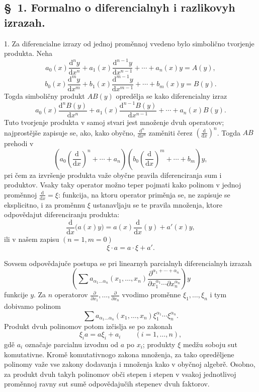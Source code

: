 \documentclass[11pt]{article}
\providecommand{\dd}{\mathrm d}
\providecommand{\p}{\partial}
\begin{document}
\subsection*{\S~1. Formalno o diferencialnyh i razlikovyh izrazah.}

1. Za diferencialne izrazy od jednoj proměnnoj vvedeno bylo simbolično tvorjenje produkta. Neha
\[
 a_0(x)\frac{\dd^n y}{\dd x^n}+a_1(x)\frac{\dd^{n-1}y}{\dd x^{n-1}}+\cdots+a_n(x)y=A(y),
\]
\[
 b_0(x)\frac{\dd^m y}{\dd x^m}+b_1(x)\frac{\dd^{m-1}y}{\dd x^{m-1}}+\cdots+b_m(x)y=B(y).
\]
Togda simboličny produkt \(AB(y)\) opredělja se kako diferencialny izraz
\[
 a_0(x)\frac{\dd^n B(y)}{\dd x^n}+a_1(x)\frac{\dd^{n-1}B(y)}{\dd x^{n-1}}+\cdots+a_n(x)B(y).
\]
Tuto tvorjenje produkta v samoj stvari jest množenje dvuh operatorov; najprostějše zapisuje se, ako, kako obyčno, \(\frac{\dd^n}{\dd x^n}\) zaměniti čerez \(\left(\frac{\dd}{\dd x}\right)^n\). Togda \(AB\) prehodi v
\[
 \left(a_0\left(\frac{\dd}{\dd x}\right)^n+\cdots+a_n\right)
 \left(b_0\left(\frac{\dd}{\dd x}\right)^m+\cdots+b_m\right)y,
\]
pri čem za izvršenje produkta važe obyčne pravila diferenciranja sum i produktov. Vsaky taky operator možno teper pojmati kako polinom v jednoj proměnnoj \(\frac{\dd}{\dd x}=\xi\): funkcija, na ktoru operator priměnja se, ne zapisuje se eksplicitno, i za proměnnu \(\xi\) ustanavljaju se te pravila množenja, ktore odpovědajut diferenciranju produkta:
\[
 \frac{\dd}{\dd x}\bigl(a(x)y\bigr)=a(x)\frac{\dd}{\dd x}(y)+a'(x)y,
\]
ili v našem zapisu \((n=1, m=0)\)
\begin{equation}
 \xi\cdot a=a\cdot\xi+a'.
\tag{1}
\end{equation}

Sovsem odpovědajuče postupa se pri linearnyh parcialnyh diferencialnyh izrazah
\[
 \left(\sum a_{\alpha_1\ldots\alpha_n}(x_1,\ldots,x_n)
 \frac{\p^{\alpha_1+\cdots+\alpha_n}}
 {\p x_1^{\alpha_1}\cdots\p x_n^{\alpha_n}}\right)y
\]
funkcije \(y\). Za \(n\) operatorov \(\frac{\p}{\p x_1},\ldots,\frac{\p}{\p x_n}\) vvodimo proměnne \(\xi_1,\ldots,\xi_n\) i tym dobivamo polinom
\[
 \sum a_{\alpha_1\ldots\alpha_n}(x_1,\ldots,x_n)
 \xi_1^{\alpha_1}\cdots\xi_n^{\alpha_n}.
\]
Produkt dvuh polinomov potom izčislja se po zakonah
\begin{equation}
 \xi_i a=a\xi_i+a_i \qquad (i=1,\ldots,n),
\tag{2}
\end{equation}
gdě \(a_i\) označaje parcialnu izvodnu od \(a\) po \(x_i\); produkty \(\xi\) medžu soboju sut komutativne. Kromě komutativnogo zakona množenja, za tako opreděljene polinomy važe vse zakony dodavanja i množenja kako v obyčnoj algebrě. Osobno, za produkt dvuh takyh polinomov obči stepen i stepen v vsakoj jednotlivoj proměnnoj ravny sut sumě odpovědajučih stepenev dvuh faktorov.
\end{document}
